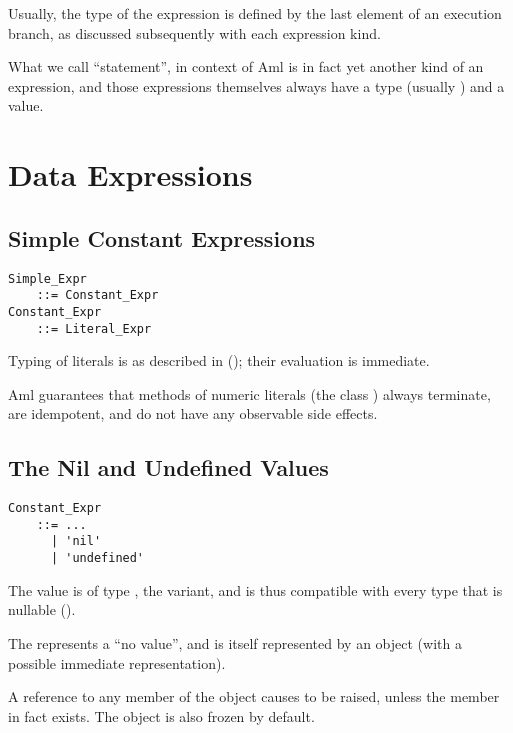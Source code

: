 Usually, the type of the expression is defined by the last element of an execution branch, as discussed subsequently with each expression kind. 

What we call ``statement'', in context of Aml is in fact yet another kind of an expression, and those expressions themselves always have a type (usually ) and a value. 





\section{Data Expressions}





\subsection{Simple Constant Expressions}
\label{sec:literal-expr}

\grammar\begin{lstlisting}
Simple_Expr 
    ::= Constant_Expr
Constant_Expr
    ::= Literal_Expr
\end{lstlisting}

Typing of literals is as described in (); their evaluation is immediate. 

Aml guarantees that methods of numeric literals (the class ) always terminate, are idempotent, and do not have any observable side effects. 






\subsection{The Nil and Undefined Values}

\grammar\begin{lstlisting}
Constant_Expr 
    ::= ...
      | 'nil'
      | 'undefined'
\end{lstlisting}

The  value is of type , the  variant, and is thus compatible with every type that is nullable ().

The  represents a ``no value'', and is itself represented by an object (with a possible immediate representation). 

A reference to any member of the  object causes  to be raised, unless the member in fact exists. The  object is also frozen by default. 

